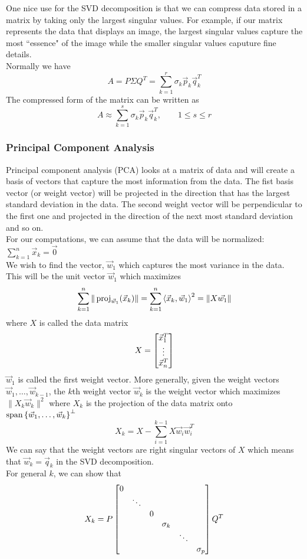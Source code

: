 \documentclass[11pt, fleqn]{article}
\begin{document}
One nice use for the SVD decomposition is that we can compress data stored in a matrix by taking only the largest singular values. For example, if our matrix represents the data that displays an image, the largest singular values capture the most ``essence" of the image while the smaller singular values caputure fine details.\\
Normally we have
$$A=P\Sigma Q^T=\sum_{k=1}^r\sigma_k\vec{p}_k\vec{q}_k^T$$
The compressed form of the matrix can be written as
$$A\approx \sum_{k=1}^s\sigma_k\vec{p}_k\vec{q}_k^T,\quad\quad 1\leq s\leq r$$


\subsubsection{Principal Component Analysis}
Principal component analysis (PCA) looks at a matrix of data and will create a basis of vectors that capture the most information from the data. The fist basis vector (or weight vector) will be projected in the direction that has the largest standard deviation in the data. The second weight vector will be perpendicular to the first one and projected in the direction of the next most standard deviation and so on.\\
For our computations, we can assume that the data will be normalized: $\sum\limits_{k=1}^n\vec{x}_k=\vec{0}$\\
We wish to find the vector, $\vec{w}_1$ which captures the most variance in the data. This will be the unit vector $\vec{w}_1$ which maximizes
$$\sum_{k=1}^n\|\operatorname{proj}_{\vec{w}_1}(\vec{x}_k)\|=\sum_{k=1}^n\left\langle \vec{x}_k,\vec{w}_1 \right\rangle^2=\|X\vec{w_1}\|$$
where $X$ is called the data matrix
$$X=\matrixx{\vec{x}_1^T\\ \vdots\\\vec{x}_n^T}$$
$\vec{w}_1$ is called the first weight vector. More generally, given the weight vectors $\vec{w}_1,\ldots,\vec{w}_{k-1}$, the $k$th weight vector $\vec{w}_k$ is the weight vector which maximizes $\|X_k\vec{w}_k\|^2$ where $X_k$ is the projection of the data matrix onto $\operatorname{span}\left\{ \vec{w}_1,\ldots,\vec{w}_k \right\}^\perp$
$$X_k=X-\sum_{i=1}^{k-1}X\vec{w}_i\vec{w}_i^T$$
We can say that the weight vectors are right singular vectors of $X$ which means that $\vec{w}_k=\vec{q}_k$ in the SVD decomposition.\\
For general $k$, we can show that
$$X_k=P\matrixx{0 & & & & & \\ & \ddots & & & & \\ & & 0 & & & \\ & & & \sigma_k & & \\ & & & & \ddots & \\ & & & & & \sigma_p}Q^T$$
\end{document}
